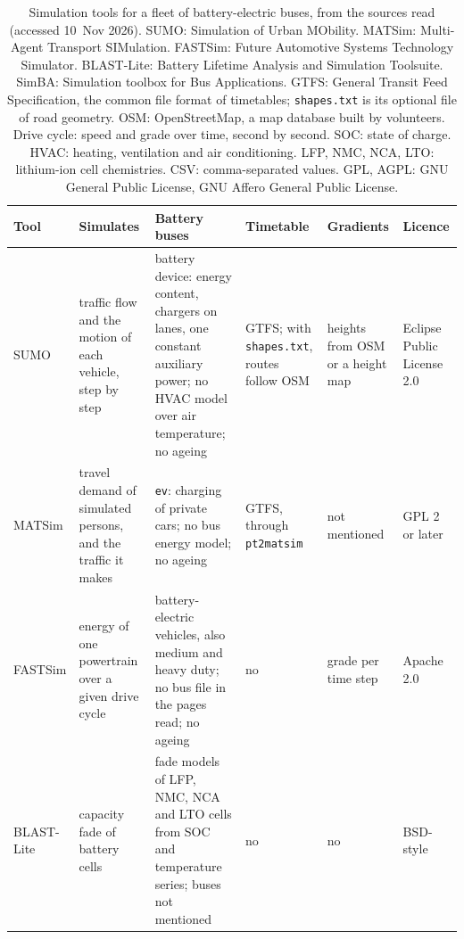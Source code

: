 \documentclass[11pt,a4paper]{article}
\theoremstyle{plain}
\theoremstyle{definition}
\theoremstyle{remark}
\begin{document}
\begin{table}[htbp]
\centering
\caption{Simulation tools for a fleet of battery-electric buses, from the sources read (accessed 10~Nov 2026).
SUMO: Simulation of Urban MObility. MATSim: Multi-Agent Transport SIMulation. FASTSim: Future Automotive Systems Technology Simulator.
BLAST-Lite: Battery Lifetime Analysis and Simulation Toolsuite. SimBA: Simulation toolbox for Bus Applications.
GTFS: General Transit Feed Specification, the common file format of timetables; \texttt{shapes.txt} is its optional file of road geometry.
OSM: OpenStreetMap, a map database built by volunteers. Drive cycle: speed and grade over time, second by second.
SOC: state of charge. HVAC: heating, ventilation and air conditioning. LFP, NMC, NCA, LTO: lithium-ion cell chemistries.
CSV: comma-separated values. GPL, AGPL: GNU General Public License, GNU Affero General Public License.}
\label{tab:cs_sim_tools}
\small
\setlength{\tabcolsep}{4pt}
\begin{tabularx}{\linewidth}{@{}>{\hsize=0.708\hsize\raggedright\arraybackslash}X>{\hsize=1.250\hsize\raggedright\arraybackslash}X>{\hsize=1.583\hsize\raggedright\arraybackslash}X>{\hsize=0.875\hsize\raggedright\arraybackslash}X>{\hsize=0.833\hsize\raggedright\arraybackslash}X>{\hsize=0.750\hsize\raggedright\arraybackslash}X@{}}
\toprule
\rowcolor{headgrey}
\textbf{Tool} & \textbf{Simulates} & \textbf{Battery buses} & \textbf{Timetable} & \textbf{Gradients} & \textbf{Licence} \\
\midrule
SUMO \cite{SUMOdocs2026} & traffic flow and the motion of each vehicle, step by step & battery device: energy content, chargers on lanes, one constant auxiliary power; no HVAC model over air temperature; no ageing & GTFS; with \texttt{shapes.txt}, routes follow OSM & heights from OSM or a height map & Eclipse Public License 2.0 \\
MATSim \cite{MATSim2026} & travel demand of simulated persons, and the traffic it makes & \texttt{ev}: charging of private cars; no bus energy model; no ageing & GTFS, through \texttt{pt2matsim} & not mentioned & GPL 2 or later \\
FASTSim \cite{FASTSim2026} & energy of one powertrain over a given drive cycle & battery-electric vehicles, also medium and heavy duty; no bus file in the pages read; no ageing & no & grade per time step & Apache 2.0 \\
BLAST-Lite \cite{BLASTLite} & capacity fade of battery cells & fade models of LFP, NMC, NCA and LTO cells from SOC and temperature series; buses not mentioned & no & no & BSD-style \\

\end{tabularx}
\end{table}
\end{document}
